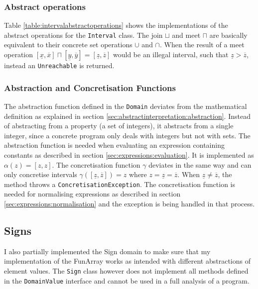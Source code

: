 \documentclass{report}
\begin{document}




\subsubsection{Abstract operations}

Table \ref{table:intervalabstractoperations} shows the implementations of the abstract operations for the \texttt{Interval} class. The join $\sqcup$ and meet $\sqcap$ are basically equivalent to their concrete set operations $\cup$ and $\cap$. When the result of a meet operation $[\underline{x},\overline{x}] \sqcap [\underline{y},\overline{y}] = [\underline{z},\overline{z}]$ would be an illegal interval, such that 
$\underline{z}>\overline{z}$, instead an \texttt{Unreachable} is returned.



\subsubsection{Abstraction and Concretisation Functions}

The abstraction function defined in the \texttt{Domain} deviates from the mathematical definition as explained in section \ref{sec:abstractinterpretation:abstraction}. Instead of abstracting from a property (a set of integers), it abstracts from a single integer, since a concrete program only deals with integers but not with sets. The abstraction function is needed when evaluating an expression containing constants as described in section \ref{sec:expressions:evaluation}. It is implemented as $\alpha(z)=[z,z]$.
The concretisation function $\gamma$ deviates in the same way and can only concretise intervals $\gamma([\underline{z},\overline{z}])=z$ where $z = \underline{z} = \overline{z}$. When $\underline{z} \neq \overline{z}$, the method throws a \texttt{ConcretisationException}. The concretisation function is needed for normalising expressions as described in section \ref{sec:expressions:normalisation} and the exception is being handled in that process. 

\subsection{Signs}
I also partially implemented the Sign domain to make sure that my implementation of the FunArray works as intended with different abstractions of element values. The \texttt{Sign} class however does not implement all methods defined in the \texttt{DomainValue} interface and cannot be used in a full analysis of a program.
\end{document}
